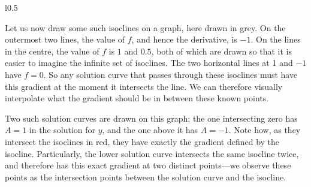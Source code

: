 \begin{wrapfigure}{l}{0.5\textwidth}
\end{wrapfigure}

Let us now draw some such isoclines on a graph, here drawn in grey.
On the outermost two lines, the value of \(f\), and hence the derivative, is \(-1\).
On the lines in the centre, the value of \(f\) is \(1\) and \(0.5\), both of which are drawn so that it is easier to imagine the infinite set of isoclines.
The two horizontal lines at 1 and \(-1\) have \(f=0\).
So any solution curve that passes through these isoclines must have this gradient at the moment it intersects the line.
We can therefore visually interpolate what the gradient should be in between these known points.

Two such solution curves are drawn on this graph; the one intersecting zero has \(A = 1\) in the solution for \(y\), and the one above it has \(A = -1\).
Note how, as they intersect the isoclines in red, they have exactly the gradient defined by the isocline.
Particularly, the lower solution curve intersects the same isocline twice, and therefore has this exact gradient at two distinct points---we observe these points as the intersection points between the solution curve and the isocline.

